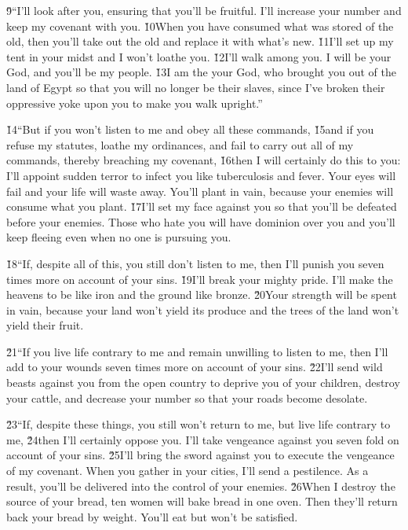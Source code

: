 \v{9}``I'll look after you, ensuring that you'll be fruitful. I'll increase your number and keep my covenant with you. \v{10}When you have consumed what was stored of the old, then you'll take out the old and replace it with what's new. \v{11}I'll set up my tent in your midst and I won't loathe you. \v{12}I'll walk among you. I will be your God, and you'll be my people. \v{13}I am the  your God, who brought you out of the land of Egypt so that you will no longer be their slaves, since I've broken their oppressive yoke upon you to make you walk upright.''

\v{14}``But if you won't listen to me and obey all these commands, \v{15}and if you refuse my statutes, loathe my ordinances, and fail to carry out all of my commands, thereby breaching my covenant, \v{16}then I will certainly do this to you: I'll appoint sudden terror to infect you like tuberculosis and fever. Your eyes will fail and your life will waste away. You'll plant in vain, because your enemies will consume what you plant. \v{17}I'll set my face against you so that you'll be defeated before your enemies. Those who hate you will have dominion over you and you'll keep fleeing even when no one is pursuing you.

\v{18}``If, despite all of this, you still don't listen to me, then I'll punish you seven times more on account of your sins. \v{19}I'll break your mighty pride. I'll make the heavens to be like iron and the ground like bronze. \v{20}Your strength will be spent in vain, because your land won't yield its produce and the trees of the land won't yield their fruit.

\v{21}``If you live life contrary to me and remain unwilling to listen to me, then I'll add to your wounds seven times more on account of your sins. \v{22}I'll send wild beasts against you from the open country to deprive you of your children, destroy your cattle, and decrease your number so that your roads become desolate.

\v{23}``If, despite these things, you still won't return to me, but live life contrary to me, \v{24}then I'll certainly oppose you. I'll take vengeance against you seven fold on account of your sins. \v{25}I'll bring the sword against you to execute the vengeance of my covenant. When you gather in your cities, I'll send a pestilence. As a result, you'll be delivered into the control of your enemies. \v{26}When I destroy the source of your bread, ten women will bake bread in one oven. Then they'll return back your bread by weight. You'll eat but won't be satisfied.

